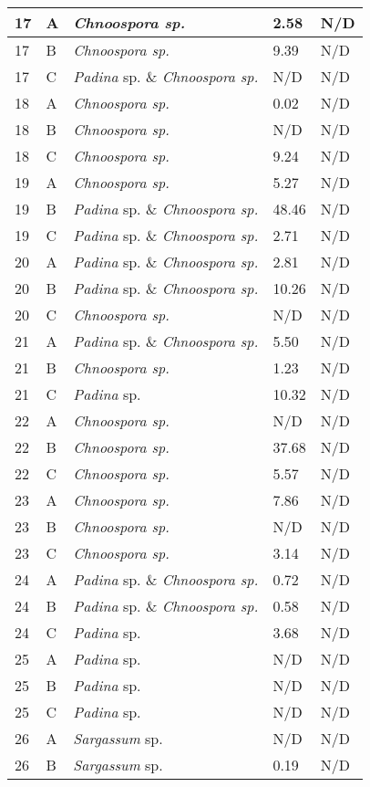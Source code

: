 \documentclass[12pt]{article}
\begin{document}
\begin{longtable}{ | p{2cm} | p{2cm} | p{3cm} | p{3.5cm} | p{3.5cm} | }
\hline
17&A&\emph{Chnoospora sp.}&2.58
&N/D\\
\hline
17&B&\emph{Chnoospora sp.}&9.39
&N/D\\
\hline
17&C&\emph{Padina} sp. \& \emph{Chnoospora sp.}&N/D&N/D\\
\hline
18&A&\emph{Chnoospora sp.}&0.02
&N/D\\
\hline
18&B&\emph{Chnoospora sp.}&N/D&N/D\\
\hline
18&C&\emph{Chnoospora sp.}&9.24
&N/D\\
\hline
19&A&\emph{Chnoospora sp.}&5.27
&N/D\\
\hline
19&B&\emph{Padina} sp. \& \emph{Chnoospora sp.}&48.46
&N/D\\
\hline
19&C&\emph{Padina} sp. \& \emph{Chnoospora sp.}&2.71
&N/D\\
\hline
20&A&\emph{Padina} sp. \& \emph{Chnoospora sp.}&2.81
&N/D\\
\hline
20&B&\emph{Padina} sp. \& \emph{Chnoospora sp.}&10.26
&N/D\\
\hline
20&C&\emph{Chnoospora sp.}&N/D&N/D\\
\hline
21&A&\emph{Padina} sp. \& \emph{Chnoospora sp.}&5.50
&N/D\\
\hline
21&B&\emph{Chnoospora sp.}&1.23
&N/D\\
\hline
21&C&\emph{Padina} sp.&10.32
&N/D\\
\hline
22&A&\emph{Chnoospora sp.}&N/D&N/D\\
\hline
22&B&\emph{Chnoospora sp.}&37.68
&N/D\\
\hline
22&C&\emph{Chnoospora sp.}&5.57
&N/D\\
\hline
23&A&\emph{Chnoospora sp.}&7.86
&N/D\\
\hline
23&B&\emph{Chnoospora sp.}&N/D&N/D\\
\hline
23&C&\emph{Chnoospora sp.}&3.14
&N/D\\
\hline
24&A&\emph{Padina} sp. \& \emph{Chnoospora sp.}&0.72
&N/D\\
\hline
24&B&\emph{Padina} sp. \& \emph{Chnoospora sp.}&0.58
&N/D\\
\hline
24&C&\emph{Padina} sp.&3.68
&N/D\\
\hline
25&A&\emph{Padina} sp.&N/D&N/D\\
\hline
25&B&\emph{Padina} sp.&N/D&N/D\\
\hline
25&C&\emph{Padina} sp.&N/D&N/D\\
\hline
26&A&\emph{Sargassum} sp.&N/D&N/D\\
\hline
26&B&\emph{Sargassum} sp.&0.19
&N/D\\

\end{longtable}
\end{document}
